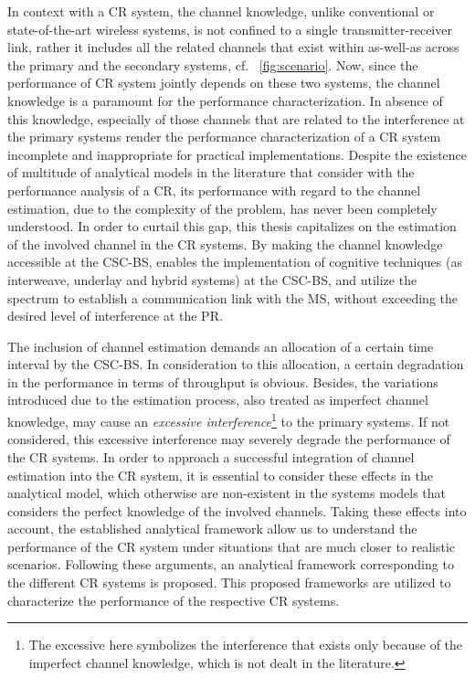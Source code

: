 In context with a CR system, the channel knowledge, unlike conventional or state-of-the-art wireless systems, is not confined to a single transmitter-receiver link, rather it includes all the related channels that exist within as-well-as across the primary and the secondary systems, cf. \figurename~\ref{fig:scenario}. Now, since the performance of CR system jointly depends on these two systems, the channel knowledge is a paramount for the performance characterization. In absence of this knowledge, especially of those channels that are related to the interference at the primary systems render the performance characterization of a CR system incomplete and inappropriate for practical implementations. Despite the existence of multitude of analytical models in the literature that consider with the performance analysis of a CR, its performance with regard to the channel estimation, due to the complexity of the problem, has never been completely understood. In order to curtail this gap, this thesis capitalizes on the estimation of the involved channel in the CR systems. By making the channel knowledge accessible at the CSC-BS, enables the implementation of cognitive techniques (as interweave, underlay and hybrid systems) at the CSC-BS, and utilize the spectrum to establish a communication link with the MS, without exceeding the desired level of interference at the PR. 

The inclusion of channel estimation demands an allocation of a certain time interval by the CSC-BS. In consideration to this allocation, a certain degradation in the performance in terms of throughput is obvious. Besides, the variations introduced due to the estimation process, also treated as imperfect channel knowledge, may cause an \textit{excessive interference}\footnote{The excessive here symbolizes the interference that exists only because of the imperfect channel knowledge, which is not dealt in the literature.} to the primary systems. If not considered, this excessive interference may severely degrade the performance of the CR systems. In order to approach a successful integration of channel estimation into the CR system, it is essential to consider these effects in the analytical model, which otherwise are non-existent in the systems models that considers the perfect knowledge of the involved channels. Taking these effects into account, the established analytical framework allow us to understand the performance of the CR system under situations that are much closer to realistic scenarios. Following these arguments, an analytical framework corresponding to the different CR systems is proposed. This proposed frameworks are utilized to characterize the performance of the respective CR systems. 

